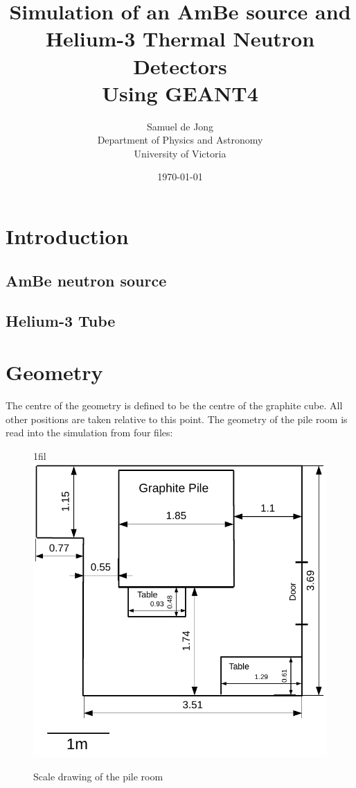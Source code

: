 \documentclass{article}
\title{Simulation of an AmBe source and Helium-3 Thermal Neutron Detectors\\ \vspace{2 mm} {\large Using GEANT4}}
\author{Samuel de Jong \\
	Department of Physics and Astronomy \\
	University of Victoria  \\
	}
\date{\today}
\makeatletter
\newcommand*{\centerfloat}{%
  \parindent \z@
  \leftskip \z@ \@plus 1fil \@minus \textwidth
  \rightskip\leftskip
  \parfillskip \z@skip}
\makeatother
\begin{document}
\maketitle

\section{Introduction}

\subsection{AmBe neutron source}


\subsection{Helium-3 Tube}



\section{Geometry}

	The centre of the geometry is defined to be the centre of the graphite cube. All other positions are taken relative to this point. The geometry of the pile room is read into the simulation from four files:
\begin{figure}[htb]
	\centerfloat
	\includegraphics[width=\columnwidth]{images/Room}
	\caption{Scale drawing of the pile room}	
	\label{fig:room}
\end{figure}
\end{document}
